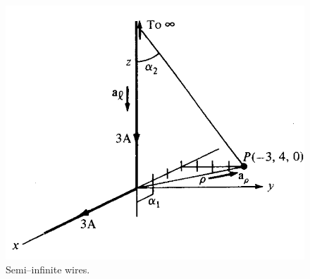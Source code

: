 \documentclass[12pt,a4paper]{article}
\begin{document}
\begin{figure}[H]
\centering
\includegraphics[scale=0.45]{Figure7-7aS.png}
\caption{Semi--infinite wires.}
\label{Semi-infinite-wires}
\end{figure}%


\end{document}
